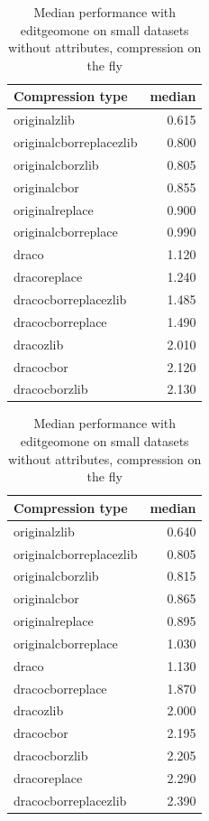 \begin{table}[!h]
    \begin{minipage}{.5\linewidth}
      \caption{
Median performance with editgeomone on small datasets, compression on the fly}
\centering

\begin{tabular}{|l|r|}
\hline
Compression type & median\\
\hline
originalzlib & 0.615\\
\hline
originalcborreplacezlib & 0.800\\
\hline
originalcborzlib & 0.805\\
\hline
originalcbor & 0.855\\
\hline
originalreplace & 0.900\\
\hline
originalcborreplace & 0.990\\
\hline
draco & 1.120\\
\hline
dracoreplace & 1.240\\
\hline
dracocborreplacezlib & 1.485\\
\hline
dracocborreplace & 1.490\\
\hline
dracozlib & 2.010\\
\hline
dracocbor & 2.120\\
\hline
dracocborzlib & 2.130\\
\hline
\end{tabular}
\end{minipage}%
    \begin{minipage}{.5\linewidth}
      \centering
        \caption{
Median performance with editgeomone on small datasets without attributes, compression on the fly}

\begin{tabular}{|l|r|}
\hline
Compression type & median\\
\hline
originalzlib & 0.640\\
\hline
originalcborreplacezlib & 0.805\\
\hline
originalcborzlib & 0.815\\
\hline
originalcbor & 0.865\\
\hline
originalreplace & 0.895\\
\hline
originalcborreplace & 1.030\\
\hline
draco & 1.130\\
\hline
dracocborreplace & 1.870\\
\hline
dracozlib & 2.000\\
\hline
dracocbor & 2.195\\
\hline
dracocborzlib & 2.205\\
\hline
dracoreplace & 2.290\\
\hline
dracocborreplacezlib & 2.390\\
\hline
\end{tabular}
\end{minipage} 
\end{table}

